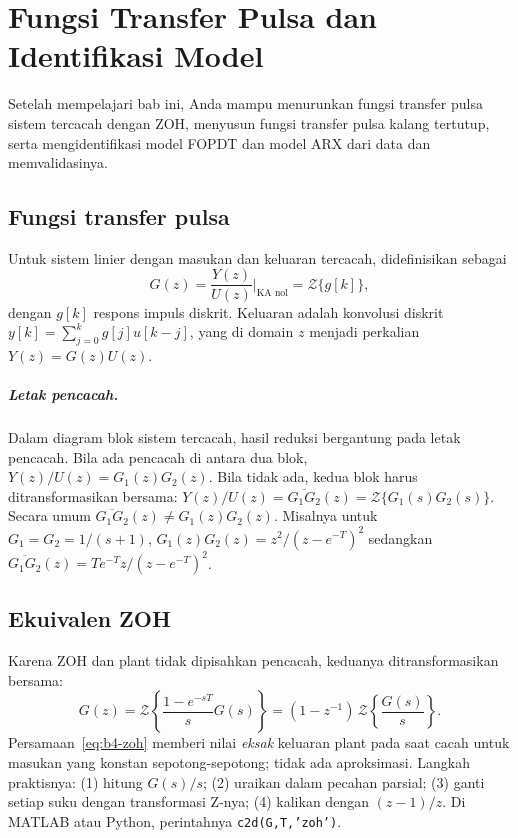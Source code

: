 \chapter{Fungsi Transfer Pulsa dan Identifikasi Model}
\label{bab:ftpulsa}

\begin{tujuan}
	Setelah mempelajari bab ini, Anda mampu menurunkan fungsi transfer pulsa sistem tercacah dengan ZOH, menyusun fungsi transfer pulsa kalang tertutup, serta mengidentifikasi model FOPDT dan model ARX dari data dan memvalidasinya.
\end{tujuan}

\section{Fungsi transfer pulsa}
Untuk sistem linier dengan masukan dan keluaran tercacah,  didefinisikan sebagai
\begin{equation}
	G(z) = \frac{Y(z)}{U(z)}\Big|_{\text{KA nol}} = \mathcal{Z}\{g[k]\},
\end{equation}
dengan $g[k]$ respons impuls diskrit. Keluaran adalah konvolusi diskrit $y[k] = \sum_{j=0}^{k}g[j]u[k-j]$, yang di domain $z$ menjadi perkalian $Y(z) = G(z)U(z)$.

\paragraph{Letak pencacah.} Dalam diagram blok sistem tercacah, hasil reduksi bergantung pada letak pencacah. Bila ada pencacah di antara dua blok, $Y(z)/U(z) = G_1(z)G_2(z)$. Bila tidak ada, kedua blok harus ditransformasikan bersama: $Y(z)/U(z) = \overline{G_1G_2}(z) = \mathcal{Z}\{G_1(s)G_2(s)\}$. Secara umum $\overline{G_1G_2}(z) \neq G_1(z)G_2(z)$. Misalnya untuk $G_1 = G_2 = 1/(s+1)$, $G_1(z)G_2(z) = z^2/(z-e^{-T})^2$ sedangkan $\overline{G_1G_2}(z) = Te^{-T}z/(z-e^{-T})^2$.

\section{Ekuivalen ZOH}
Karena ZOH dan plant tidak dipisahkan pencacah, keduanya ditransformasikan bersama:
\begin{equation}
	G(z) = \mathcal{Z}\left\{\frac{1-e^{-sT}}{s}G(s)\right\} = (1-z^{-1})\,\mathcal{Z}\left\{\frac{G(s)}{s}\right\}.
	\label{eq:b4-zoh}
\end{equation}
Persamaan~\eqref{eq:b4-zoh} memberi nilai \emph{eksak} keluaran plant pada saat cacah untuk masukan yang konstan sepotong-sepotong; tidak ada aproksimasi. Langkah praktisnya: (1) hitung $G(s)/s$; (2) uraikan dalam pecahan parsial; (3) ganti setiap suku dengan transformasi Z-nya; (4) kalikan dengan $(z-1)/z$. Di MATLAB atau Python, perintahnya \texttt{c2d(G,T,'zoh')}.

